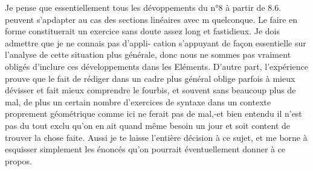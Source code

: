 

Je pense que essentiellement tous les dévoppements du n°8 à
partir de 8.6. peuvent s'apdapter  au cas des sections linéaires avec
m quelconque. Le faire en forme constituerait un exercice sans doute
assez long et fastidieux. Je dois admettre que je ne connais pas d'appli-%
cation s'appuyant de façon essentielle sur l'analyse de cette situation
plus générale, donc nous ne sommes pas vraiment obligés d'inclure ces
développements dans les Eléments. D'autre part, l'expérience prouve que
le fait de rédiger dans un cadre plus général oblige parfois à mieux
dévisser et fait mieux comprendre le fourbis, et souvent sans beaucoup
plus de mal, de plus un certain nombre d'exercices de syntaxe dans un
contexte proprement géométrique comme ici ne ferait pas de mal,-et
bien entendu il n'est pas du tout exclu qu'on en ait quand même besoin
un jour et soit content de trouver la chose faite. Aussi je te laisse
l'entière décision à ce sujet, et me borne à esquisser simplement les
énoncés qu'on pourrait éventuellement donner à ce propos.

